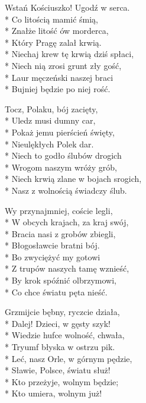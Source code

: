 \begin{lyrics}[longestline={Niech krwią zlane w bojach srogich,}]
\chorusref

\breaklyrics

Wstań Kościuszko! Ugodź w serca.\\*
Co litością mamić śmią,\\*
Znałże litość ów morderca,\\*
Który Pragę zalał krwią.\\*
Niechaj krew tę krwią dziś spłaci,\\*
Niech nią zrosi grunt zły gość,\\*
Laur męczeński naszej braci\\*
Bujniej będzie po niej rość.

\chorusref

Tocz, Polaku, bój zacięty,\\*
Uledz musi dumny car,\\*
Pokaż jemu pierścień święty,\\*
Nieulękłych Polek dar.\\*
Niech to godło ślubów drogich\\*
Wrogom naszym wróży grób,\\*
Niech krwią zlane w bojach srogich,\\*
Nasz z wolnością świadczy ślub.

\chorusref

Wy przynajmniej, coście legli,\\*
W obcych krajach, za kraj swój,\\*
Bracia nasi z grobów zbiegli,\\*
Błogosławcie bratni bój.\\*
Bo zwyciężyć my gotowi\\*
Z trupów naszych tamę wznieść,\\*
By krok spóźnić olbrzymowi,\\*
Co chce światu pęta nieść.

\chorusref

Grzmijcie bębny, ryczcie działa,\\*
Dalej! Dzieci, w gęsty szyk!\\*
Wiedzie hufce wolność, chwała,\\*
Tryumf błyska w ostrzu pik.\\*
Leć, nasz Orle, w górnym pędzie,\\*
Sławie, Polsce, światu służ!\\*
Kto przeżyje, wolnym będzie;\\*
Kto umiera, wolnym już!

\chorusref
\end{lyrics}



